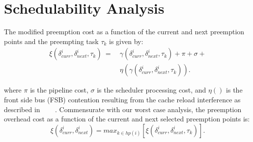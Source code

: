 \section{Schedulability Analysis}\label{sec:schedulability_analysis}

The modified preemption cost as a function of the current and next preemption points and the preempting task \begin{math}\tau_{k}\end{math} is given by:
\begin{equation}\label{eqn:prempt-cost}
\begin{split}
    \xi(\delta_{curr}^{i},\delta_{next}^{i},\tau_{k})\ =\ &\gamma(\delta_{curr}^{i},\delta_{next}^{i},\tau_{k}) + \pi + \sigma + \\ &\eta(\gamma(\delta_{curr}^{i},\delta_{next}^{i},\tau_{k})).
\end{split}
\end{equation}

 \noindent
 where \begin{math}\pi\end{math} is the pipeline cost, \begin{math}\sigma\end{math} is the scheduler processing cost, and \begin{math}\eta()\end{math} is the front side bus (FSB) contention resulting from the cache reload interference as described in~\cite{pellizzoni:07} ~\cite{pellizzoni:08} ~\cite{pellizzoni:11}.  Commensurate with our worst case analysis, the preemption overhead cost as a function of the current and next selected preemption points is:
\begin{equation}\label{eqn:prempt-cost}
    \xi(\delta_{curr}^{i},\delta_{next}^{i}) = \textit{max}_{k \in hp(i)} [ \xi(\delta_{curr}^{i},\delta_{next}^{i},\tau_{k})].
\end{equation}
